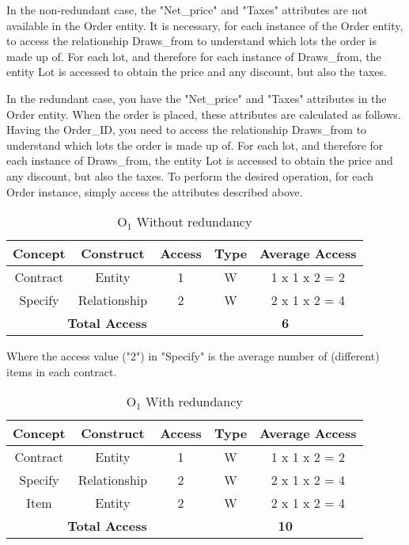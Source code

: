 In the non-redundant case, the "Net_price" and "Taxes" attributes are not available in the Order entity. It is necessary, for each instance of the Order entity, to access the relationship Draws_from to understand which lots the order is made up of. For each lot, and therefore for each instance of Draws_from, the entity Lot is accessed to obtain the price and any discount, but also the taxes.

In the redundant case, you have the "Net_price" and "Taxes" attributes in the Order entity. When the order is placed, these attributes are calculated as follows. Having the Order_ID, you need to access the relationship Draws_from to understand which lots the order is made up of. For each lot, and therefore for each instance of Draws_from, the entity Lot is accessed to obtain the price and any discount, but also the taxes. To perform the desired operation, for each Order instance, simply access the attributes described above.

\begin{table}[!h]\caption{	$ \textrm{O}_\textrm{1} $ Without redundancy}
	\begin{center}
		\begin{tabular}{| c | c | c | c | c |}
			\hline
			\textbf{Concept} & \textbf{Construct} & \textbf{Access} & \textbf{Type} & \textbf{Average Access} \\ \hline
			Contract & Entity & 1 & W & 1 x 1 x 2 = 2 \\ \hline
			Specify & Relationship & 2 & W & 2 x 1 x 2 = 4 \\ \hline
			\multicolumn{3}{|c|}{\textbf{Total Access}} & \multicolumn{2}{|c|}{\textbf{6}} \\ \hline
		\end{tabular}
	\end{center}
\end{table}

Where the access value ("2") in "Specify" is the average number of (different) items in each contract.

\begin{table}[!h]\caption{	$ \textrm{O}_\textrm{1} $ With redundancy}
	\begin{center}
		\begin{tabular}{| c | c | c | c | c |}
			\hline
			\textbf{Concept} & \textbf{Construct} & \textbf{Access} & \textbf{Type} & \textbf{Average Access} \\ \hline
			Contract & Entity & 1 & W & 1 x 1 x 2 = 2 \\ \hline
			Specify & Relationship & 2 & W & 2 x 1 x 2 = 4 \\ \hline
			Item & Entity & 2 & W & 2 x 1 x 2 = 4 \\ \hline
			\multicolumn{3}{|c|}{\textbf{Total Access}} & \multicolumn{2}{|c|}{\textbf{10}} \\ \hline
		\end{tabular}
	\end{center}
\end{table}

